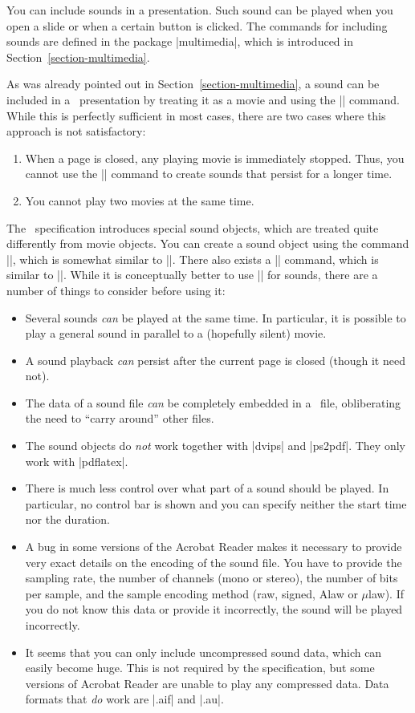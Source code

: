 You can include sounds in a presentation. Such sound can be played when you open a slide or when a certain button is clicked. The commands for including sounds are defined in the package |multimedia|, which is introduced in Section~\ref{section-multimedia}.

As was already pointed out in Section~\ref{section-multimedia}, a sound can be included in a \pdf\ presentation by treating it as a movie and using the |\movie| command. While this is perfectly sufficient in most cases, there are two cases where this approach is not satisfactory:
\begin{enumerate}
\item
  When a page is closed, any playing movie is immediately stopped. Thus, you cannot use the |\movie| command to create sounds that persist for a longer time.
\item
  You cannot play two movies at the same time.
\end{enumerate}

The \pdf\ specification introduces special sound objects, which are treated quite differently from movie objects. You can create a sound object using the command |\sound|, which is somewhat similar to |\movie|. There also exists a |\hyperlinksound| command, which is similar to |\hyperlinkmovie|. While it is conceptually better to use |\sound| for sounds, there are a number of things to consider before using it:
\begin{itemize}
\item
  Several sounds \emph{can} be played at the same time. In particular, it is possible to play a general sound in parallel to a (hopefully silent) movie.
\item
  A sound playback \emph{can} persist after the current page is closed (though it need not).
\item
  The data of a sound file \emph{can} be completely embedded in a \pdf\ file, obliberating the need to ``carry around'' other files.
\item
  The sound objects do \emph{not} work together with |dvips| and |ps2pdf|. They only work with |pdflatex|.
\item
  There is much less control over what part of a sound should be played. In particular, no control bar is shown and you can specify neither the start time nor the duration.
\item
  A bug in some versions of the Acrobat Reader makes it necessary to provide very exact details on the encoding of the sound file. You have to provide the sampling rate, the number of channels (mono or stereo), the number of bits per sample, and the sample encoding method (raw, signed, Alaw or $\mu$law). If you do not know this data or provide it incorrectly, the sound will be played incorrectly.
\item
  It seems that you can only include uncompressed sound data, which can easily become huge. This is not required by the specification, but some versions of Acrobat Reader are unable to play any compressed data. Data formats that \emph{do} work are |.aif| and |.au|.
\end{itemize}

